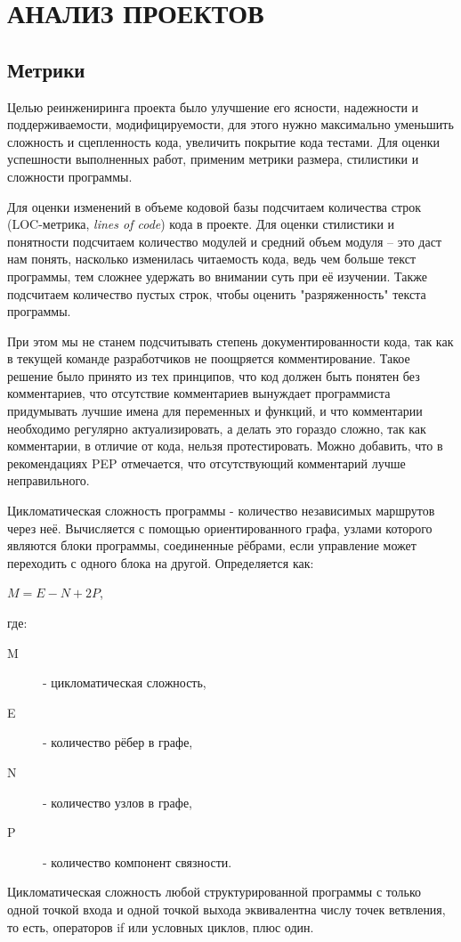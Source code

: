 \section{АНАЛИЗ ПРОЕКТОВ}
    \subsection{Метрики}
    Целью реинжениринга проекта было улучшение его ясности, надежности и поддерживаемости,
    модифицируемости, для этого нужно максимально уменьшить сложность и сцепленность кода,
    увеличить покрытие кода тестами.
    Для оценки успешности выполненных работ, применим метрики размера,
    стилистики и сложности программы.
    \cite{clearcode.habr}

    Для оценки изменений в объеме кодовой базы подсчитаем количества строк
    (LOC-метрика, \textit{lines of code}) кода в проекте.
    Для оценки стилистики и понятности подсчитаем количество модулей и средний
    объем модуля -- это даст нам понять, насколько изменилась читаемость кода,
    ведь чем больше текст программы, тем сложнее удержать во внимании суть при 
    её изучении. Также подсчитаем количество пустых строк, чтобы оценить
    "разряженность" текста программы.

    При этом мы не станем подсчитывать степень документированности кода,
    так как в текущей команде разработчиков не поощряется комментирование.
    Такое решение было принято из тех принципов,
    что код должен быть понятен без комментариев,
    что отсутствие комментариев вынуждает программиста придумывать лучшие имена
    для переменных и функций,
    и что комментарии необходимо регулярно актуализировать, а делать это
    гораздо сложно, так как комментарии, в отличие от кода,  нельзя
    протестировать.
    Можно добавить, что в рекомендациях PEP отмечается, что отсутствующий
    комментарий лучше неправильного.

    Цикломатическая сложность программы - количество независимых маршрутов через
    неё. Вычисляется с помощью ориентированного графа, узлами которого являются
    блоки программы, соединенные рёбрами, если управление может переходить с
    одного блока на другой. Определяется как:
    \begin{center}
        $ M = E - N + 2P $, 
    \end{center}
    где:
    \begin{description}
        \item [M] - цикломатическая сложность,
        \item [E] - количество рёбер в графе,
        \item [N] - количество узлов в графе,
        \item [P] - количество компонент связности.
    \end{description}
    Цикломатическая сложность любой структурированной программы с только одной
    точкой входа и одной точкой выхода эквивалентна числу точек ветвления,
    то есть, операторов if или условных циклов, плюс один.
    \cite{complexity.McCabe}


